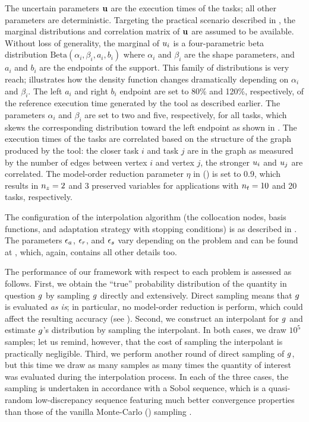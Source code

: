 
The uncertain parameters $\mathbf{u}$ are the execution times of the tasks; all other
parameters are deterministic. Targeting the practical scenario described in
, the marginal distributions and correlation matrix of $\mathbf{u}$
are assumed to be available. Without loss of generality, the marginal of $u_i$
is a four-parametric beta distribution $\text{Beta}(\alpha_i, \beta_i, a_i,
b_i)$ where $\alpha_i$ and $\beta_i$ are the shape parameters, and $a_i$ and
$b_i$ are the endpoints of the support. This family of distributions is very
reach;  illustrates how the density function changes
dramatically depending on $\alpha_i$ and $\beta_i$. The left $a_i$ and right
$b_i$ endpoint are set to 80\% and 120\%, respectively, of the reference
execution time generated by the  tool as described earlier. The
parameters $\alpha_i$ and $\beta_i$ are set to two and five, respectively, for
all tasks, which skews the corresponding distribution toward the left endpoint
as shown in . The execution times of the tasks are correlated
based on the structure of the graph produced by the  tool: the closer
task $i$ and task $j$ are in the graph as measured by the number of edges
between vertex $i$ and vertex $j$, the stronger $u_i$ and $u_j$ are
correlated. The model-order reduction parameter $\eta$ in 
() is set to 0.9, which results in ${n_z} = 2$ and 3 preserved
variables for applications with ${n_t} = 10$ and 20 tasks, respectively.

The configuration of the interpolation algorithm (the collocation nodes, basis
functions, and adaptation strategy with stopping conditions) is as described in
. The parameters $\epsilon_a$, $\epsilon_r$, and $\epsilon_s$ vary
depending on the problem and can be found at \cite{sources}, which, again,
contains all other details too.

The performance of our framework with respect to each problem is assessed as
follows. First, we obtain the ``true'' probability distribution of the quantity
in question $g$ by sampling $g$ directly and extensively. Direct sampling
means that $g$ is evaluated \emph{as is}; in particular, no model-order
reduction is perform, which could affect the resulting accuracy (see
). Second, we construct an interpolant for $g$ and estimate
$g$'s distribution by sampling the interpolant. In both cases, we draw $10^5$
samples; let us remind, however, that the cost of sampling the interpolant is
practically negligible. Third, we perform another round of direct sampling of
$g$, but this time we draw as many samples as many times the quantity of
interest was evaluated during the interpolation process. In each of the three
cases, the sampling is undertaken in accordance with a Sobol sequence, which is
a quasi-random low-discrepancy sequence featuring much better convergence
properties than those of the vanilla Monte-Carlo () sampling
\cite{joe2008}.

